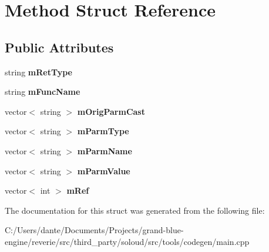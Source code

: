 \hypertarget{struct_method}{}\section{Method Struct Reference}
\label{struct_method}
\subsection*{Public Attributes}
\begin{DoxyCompactItemize}
\item 
\mbox{\label{struct_method_ae6c759265f3fae4125704e0e5f57a6ac}} 
string {\bfseries m\+Ret\+Type}
\item 
\mbox{\label{struct_method_a4cf5ff65610770813052147760ee9b67}} 
string {\bfseries m\+Func\+Name}
\item 
\mbox{\label{struct_method_a6f9a312754e2078ff958e418495aa203}} 
vector$<$ string $>$ {\bfseries m\+Orig\+Parm\+Cast}
\item 
\mbox{\label{struct_method_a72542fe92d541d1b1ae50fb8e6ca4343}} 
vector$<$ string $>$ {\bfseries m\+Parm\+Type}
\item 
\mbox{\label{struct_method_ab8c164789c4efd7c7a13e4b5ceaa45b2}} 
vector$<$ string $>$ {\bfseries m\+Parm\+Name}
\item 
\mbox{\label{struct_method_ad6f2de741d98f940dac2bde3566b0a08}} 
vector$<$ string $>$ {\bfseries m\+Parm\+Value}
\item 
\mbox{\label{struct_method_ab20ebab48e08f3bda9b69de2fc2eb31b}} 
vector$<$ int $>$ {\bfseries m\+Ref}
\end{DoxyCompactItemize}


The documentation for this struct was generated from the following file\+:\begin{DoxyCompactItemize}
\item 
C\+:/\+Users/dante/\+Documents/\+Projects/grand-\/blue-\/engine/reverie/src/third\+\_\+party/soloud/src/tools/codegen/main.\+cpp\end{DoxyCompactItemize}
